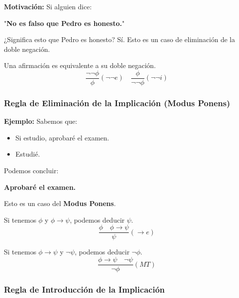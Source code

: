 \textbf{Motivación:}  
Si alguien dice:  
\begin{center}
    "\textbf{No es falso que Pedro es honesto.}"
\end{center}
¿Significa esto que Pedro es honesto?  
Sí. Esto es un caso de eliminación de la doble negación.

\begin{tcolorbox}[colframe=blue!60, colback=blue!5, title=\textbf{Regla de la Doble Negación}]
Una afirmación es equivalente a su doble negación.
\[
\frac{\neg \neg \phi}{\phi} (\neg \neg e) \quad
\frac{\phi}{\neg \neg \phi} (\neg \neg i)
\]
\end{tcolorbox}

\subsubsection{Regla de Eliminación de la Implicación (Modus Ponens)}

\noindent \textbf{Ejemplo:}  
Sabemos que:
\begin{itemize}
    \item Si estudio, aprobaré el examen.
    \item Estudié.
\end{itemize}
Podemos concluir:
\begin{center}
    \textbf{Aprobaré el examen.}
\end{center}

Esto es un caso del \textbf{Modus Ponens}.


\begin{tcolorbox}[colframe=blue!60, colback=blue!5, title=\textbf{Modus Ponens (\(\rightarrow e\))}]
Si tenemos \(\phi\) y \(\phi \rightarrow \psi\), podemos deducir \(\psi\).
\[
\frac{\phi \quad \phi \rightarrow \psi}{\psi} (\rightarrow e)
\]
\end{tcolorbox}

\begin{tcolorbox}[colframe=red!60, colback=red!5, title=\textbf{Modus Tollens (MT)}]
Si tenemos \(\phi \rightarrow \psi\) y \(\neg \psi\), podemos deducir \(\neg \phi\).
\[
\frac{\phi \rightarrow \psi \quad \neg \psi}{\neg \phi} (MT)
\]
\end{tcolorbox}



\subsubsection{Regla de Introducción de la Implicación}


